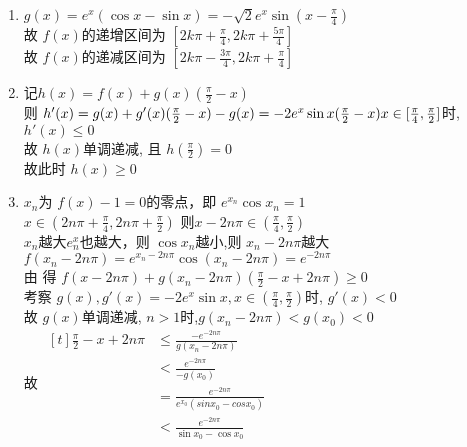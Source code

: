 \documentclass[class=ctexart,crop=false]{standalone}
\begin{document}
\begin{enumerate}[label=(\Roman*)]
    \item $g(x)=e^x({\cos{x}-\sin{x}})=-\sqrt{2}e^x\sin{(x-\frac{\pi}{4})}$\\
    故 $f(x)$的递增区间为 $[2k\pi+\frac{\pi}{4},2k\pi+\frac{5\pi}{4}]$\\
    故 $f(x)$的递减区间为 $[2k\pi-\frac{3\pi}{4},2k\pi+\frac{\pi}{4}]$
    \item 记$h(x)=f(x)+g(x)(\frac{\pi}{2}-x)$\\
    则 $h'(x)=g(x)+g'(x)(\frac{\pi}{2}-x)-g(x)\\
    =-2e^x\sin{x}(\frac{\pi}{2}-x)\\
    x \in [\frac{\pi}{4},\frac{\pi}{2}]$时,$h'(x)\leqslant 0$\\
    故 $h(x)$单调递减,
    且 $h(\frac{\pi}{2})=0$\\
    故此时 $h(x)\geqslant 0$
    \item 
    $x_n$为 $f(x)-1=0$的零点，即 $e^{x_n}\cos{x_n}=1$\\
    $x \in (2n\pi+\frac{\pi}{4},2n\pi+\frac{\pi}{2})$
    则$x-2n\pi \in (\frac{\pi}{4},\frac{\pi}{2})$\\
    $x_n$越大$e^x_n$也越大，则 $\cos{x_n}$越小,则 $x_n-2n\pi$越大\\
    $f(x_n-2n\pi)=e^{x_n-2n\pi}\cos{(x_n-2n\pi)}=e^{-2n\pi}$\\
    由  得 $f(x-2n\pi)+g(x_n-2n\pi)(\frac{\pi}{2}-x+2n\pi)\geqslant 0$\\
    考察 $g(x),g'(x)=-2e^x\sin{x},x\in (\frac{\pi}{4},\frac{\pi}{2})$时, $g'(x)<0$\\
    故 $g(x)$单调递减, $n>1$时,$g(x_n-2n\pi)< g(x_0)<0$\\

    故 $\begin{aligned}[t]
        \frac{\pi}{2}-x+2n\pi &\leqslant \frac{-e^{-2n\pi}}{g(x_n-2n\pi)}\\
        &<\frac{e^{-2n\pi}}{-g(x_0)}\\
        &=\frac{e^{-2n\pi}}{e^{x_0}(sinx_0-cosx_0)}\\
        &<\frac{e^{-2n\pi}}{\sin{x_0}-\cos{x_0}}
    \end{aligned}$ 
\end{enumerate}
\end{document}

